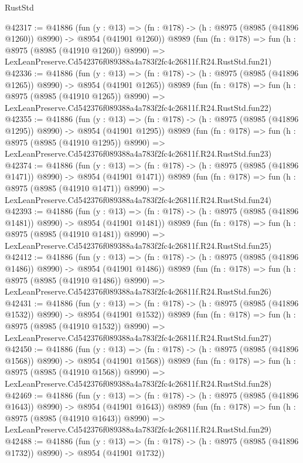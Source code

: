 \begin{lexlean}{RustStd}
\begin{coremodule}
@42317 := @41886
    (fun (y : @13) =>
    (fn : @178) -> (h : @8975 (@8985 (@41896 @1260)) @8990) -> @8954 (@41901 @1260))
    @8989
    (fun (fn : @178) =>
    fun (h : @8975 (@8985 (@41910 @1260)) @8990) =>
    LexLeanPreserve.Cd542376f089388a4a783f2fc4c26811f.R24.RustStd.fun21)
@42336 := @41886
    (fun (y : @13) =>
    (fn : @178) -> (h : @8975 (@8985 (@41896 @1265)) @8990) -> @8954 (@41901 @1265))
    @8989
    (fun (fn : @178) =>
    fun (h : @8975 (@8985 (@41910 @1265)) @8990) =>
    LexLeanPreserve.Cd542376f089388a4a783f2fc4c26811f.R24.RustStd.fun22)
@42355 := @41886
    (fun (y : @13) =>
    (fn : @178) -> (h : @8975 (@8985 (@41896 @1295)) @8990) -> @8954 (@41901 @1295))
    @8989
    (fun (fn : @178) =>
    fun (h : @8975 (@8985 (@41910 @1295)) @8990) =>
    LexLeanPreserve.Cd542376f089388a4a783f2fc4c26811f.R24.RustStd.fun23)
@42374 := @41886
    (fun (y : @13) =>
    (fn : @178) -> (h : @8975 (@8985 (@41896 @1471)) @8990) -> @8954 (@41901 @1471))
    @8989
    (fun (fn : @178) =>
    fun (h : @8975 (@8985 (@41910 @1471)) @8990) =>
    LexLeanPreserve.Cd542376f089388a4a783f2fc4c26811f.R24.RustStd.fun24)
@42393 := @41886
    (fun (y : @13) =>
    (fn : @178) -> (h : @8975 (@8985 (@41896 @1481)) @8990) -> @8954 (@41901 @1481))
    @8989
    (fun (fn : @178) =>
    fun (h : @8975 (@8985 (@41910 @1481)) @8990) =>
    LexLeanPreserve.Cd542376f089388a4a783f2fc4c26811f.R24.RustStd.fun25)
@42412 := @41886
    (fun (y : @13) =>
    (fn : @178) -> (h : @8975 (@8985 (@41896 @1486)) @8990) -> @8954 (@41901 @1486))
    @8989
    (fun (fn : @178) =>
    fun (h : @8975 (@8985 (@41910 @1486)) @8990) =>
    LexLeanPreserve.Cd542376f089388a4a783f2fc4c26811f.R24.RustStd.fun26)
@42431 := @41886
    (fun (y : @13) =>
    (fn : @178) -> (h : @8975 (@8985 (@41896 @1532)) @8990) -> @8954 (@41901 @1532))
    @8989
    (fun (fn : @178) =>
    fun (h : @8975 (@8985 (@41910 @1532)) @8990) =>
    LexLeanPreserve.Cd542376f089388a4a783f2fc4c26811f.R24.RustStd.fun27)
@42450 := @41886
    (fun (y : @13) =>
    (fn : @178) -> (h : @8975 (@8985 (@41896 @1568)) @8990) -> @8954 (@41901 @1568))
    @8989
    (fun (fn : @178) =>
    fun (h : @8975 (@8985 (@41910 @1568)) @8990) =>
    LexLeanPreserve.Cd542376f089388a4a783f2fc4c26811f.R24.RustStd.fun28)
@42469 := @41886
    (fun (y : @13) =>
    (fn : @178) -> (h : @8975 (@8985 (@41896 @1643)) @8990) -> @8954 (@41901 @1643))
    @8989
    (fun (fn : @178) =>
    fun (h : @8975 (@8985 (@41910 @1643)) @8990) =>
    LexLeanPreserve.Cd542376f089388a4a783f2fc4c26811f.R24.RustStd.fun29)
@42488 := @41886
    (fun (y : @13) =>
    (fn : @178) -> (h : @8975 (@8985 (@41896 @1732)) @8990) -> @8954 (@41901 @1732))

\end{coremodule}
\end{lexlean}
